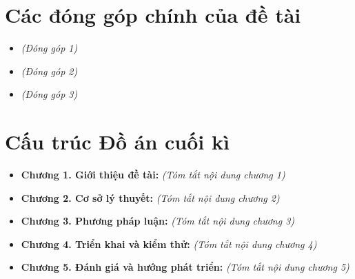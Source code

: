 \section{Các đóng góp chính của đề tài}
\begin{itemize}
    \item \textit{(Đóng góp 1)}
    \item \textit{(Đóng góp 2)}
    \item \textit{(Đóng góp 3)}
\end{itemize}

\section{Cấu trúc Đồ án cuối kì}
\begin{itemize}
    \item \textbf{Chương 1. Giới thiệu đề tài:} \textit{(Tóm tắt nội dung chương 1)}
    \item \textbf{Chương 2. Cơ sở lý thuyết:} \textit{(Tóm tắt nội dung chương 2)}
    \item \textbf{Chương 3. Phương pháp luận:} \textit{(Tóm tắt nội dung chương 3)}
    \item \textbf{Chương 4. Triển khai và kiểm thử:} \textit{(Tóm tắt nội dung chương 4)}
    \item \textbf{Chương 5. Đánh giá và hướng phát triển:} \textit{(Tóm tắt nội dung chương 5)}
\end{itemize}

